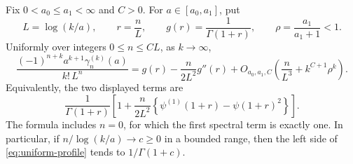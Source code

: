 \begin{theorem}\label{thm:profile}
Fix \(0<a_0\le a_1<\infty\) and \(C>0\). For
\(a\in[a_0,a_1]\), put
\[
L=\log(k/a),\qquad r=\frac nL,\qquad
g(r)=\frac1{\Gamma(1+r)},\qquad
\rho=\frac{a_1}{a_1+1}<1.
\]
Uniformly over integers \(0\le n\le CL\), as \(k\to\infty\),
\begin{equation}\label{eq:uniform-profile}
\frac{(-1)^{n+k}a^{k+1}\gamma_n^{(k)}(a)}{k!\,L^n}
=g(r)-\frac{n}{2L^2}g''(r)
 +O_{a_0,a_1,C}\left(\frac n{L^3}+k^{C+1}\rho^k\right).
\end{equation}
Equivalently, the two displayed terms are
\begin{equation}\label{eq:profile-polygamma}
\frac1{\Gamma(1+r)}
\left[1+\frac{n}{2L^2}
 \left\{\psi^{(1)}(1+r)-\psi(1+r)^2\right\}\right].
\end{equation}
The formula includes \(n=0\), for which the first spectral term is
exactly one. In particular, if \(n/\log(k/a)\to c\ge0\) in a bounded
range, then the left side of \eqref{eq:uniform-profile} tends to
\(1/\Gamma(1+c)\).
\end{theorem}

